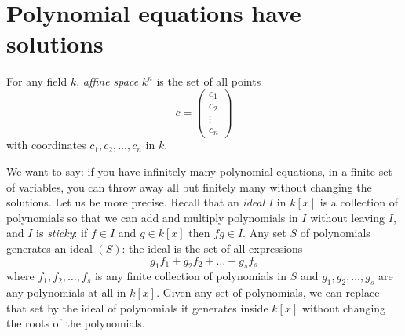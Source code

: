 \chapter{Polynomial equations have solutions}


For any field \(k\), \emph{affine space} \(k^n\) is the set of all points
\[
c=
\begin{pmatrix}
c_1 \\
c_2 \\
\vdots \\
c_n
\end{pmatrix}
\]
with coordinates \(c_1, c_2, \dots, c_n\) in \(k\).

We want to say: if you have infinitely many polynomial equations, in a finite set of variables, you can throw away all but finitely many without changing the solutions.
Let us be more precise.
Recall that an \emph{ideal} \(I\) in \(k[x]\) is a collection of  polynomials so that we can add and multiply polynomials in \(I\) without leaving \(I\), and \(I\) is \emph{sticky}: if \(f \in I\) and \(g \in k[x]\) then \(fg \in I\).
Any set \(S\) of polynomials generates an ideal \((S)\): the ideal is the set of all expressions
\[
g_1 f_1 + g_2 f_2 + \dots + g_s f_s
\]
where \(f_1, f_2, \dots, f_s\) is any finite collection of polynomials in \(S\) and \(g_1, g_2, \dots, g_s\) are any polynomials at all in \(k[x]\).
Given any set of polynomials, we can replace that set by the ideal of polynomials it generates inside \(k[x]\) without changing the roots of the polynomials.

